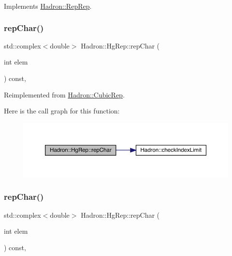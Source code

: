Implements \mbox{\hyperlink{structHadron_1_1RepRep_ab3213025f6de249f7095892109575fde}{Hadron\+::\+Rep\+Rep}}.

\mbox{\label{structHadron_1_1HgRep_a49537241226a4b230d73e72cb1a21de3}} 
\subsubsection{\texorpdfstring{repChar()}{repChar()}\hspace{0.1cm}{\footnotesize\ttfamily [1/3]}}
{\footnotesize\ttfamily std\+::complex$<$double$>$ Hadron\+::\+Hg\+Rep\+::rep\+Char (\begin{DoxyParamCaption}\item[{int}]{elem }\end{DoxyParamCaption}) const\hspace{0.3cm}{\ttfamily [inline]}, {\ttfamily [virtual]}}



Reimplemented from \mbox{\hyperlink{structHadron_1_1CubicRep_af45227106e8e715e84b0af69cd3b36f8}{Hadron\+::\+Cubic\+Rep}}.

Here is the call graph for this function\+:
\nopagebreak
\begin{figure}[H]
\begin{center}
\leavevmode
\includegraphics[width=350pt]{d5/d3a/structHadron_1_1HgRep_a49537241226a4b230d73e72cb1a21de3_cgraph}
\end{center}
\end{figure}
\mbox{\label{structHadron_1_1HgRep_a49537241226a4b230d73e72cb1a21de3}} 
\subsubsection{\texorpdfstring{repChar()}{repChar()}\hspace{0.1cm}{\footnotesize\ttfamily [2/3]}}
{\footnotesize\ttfamily std\+::complex$<$double$>$ Hadron\+::\+Hg\+Rep\+::rep\+Char (\begin{DoxyParamCaption}\item[{int}]{elem }\end{DoxyParamCaption}) const\hspace{0.3cm}{\ttfamily [inline]}, {\ttfamily [virtual]}}



